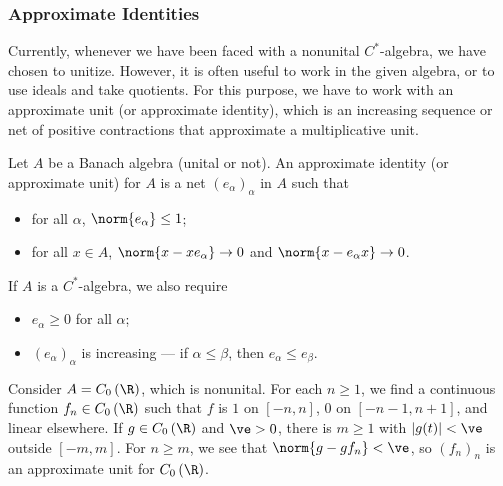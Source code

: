 \documentclass[10pt]{mypackage}
\begin{document}
\subsubsection{Approximate Identities}%
Currently, whenever we have been faced with a nonunital $C^{\ast}$-algebra, we have chosen to unitize. However, it is often useful to work in the given algebra, or to use ideals and take quotients. For this purpose, we have to work with an approximate unit (or approximate identity), which is an increasing sequence or net of positive contractions that approximate a multiplicative unit.
\begin{definition}
  Let $A$ be a Banach algebra (unital or not). An approximate identity (or approximate unit) for $A$ is a net $\left(e_{\alpha}\right)_{\alpha}$ in $A$ such that
  \begin{itemize}
    \item for all $\alpha$, $\norm{e_{\alpha}} \leq 1$;
    \item for all $x\in A$, $\norm{x - xe_{\alpha}}\rightarrow 0$ and $\norm{x - e_{\alpha}x}\rightarrow 0$.
  \end{itemize}
  If $A$ is a $C^{\ast}$-algebra, we also require
  \begin{itemize}
    \item $e_{\alpha}\geq 0$ for all $\alpha$;
    \item $\left(e_{\alpha}\right)_{\alpha}$ is increasing --- if $\alpha \leq \beta$, then $e_{\alpha}\leq e_{\beta}$.
  \end{itemize}
\end{definition}
\begin{example}
  Consider $A = C_0\left(\R\right)$, which is nonunital. For each $n\geq 1$, we find a continuous function $f_n\in C_0\left(\R\right)$ such that $f$ is $1$ on $\left[-n,n\right]$, $0$ on $\left[-n-1,n+1\right]$, and linear elsewhere. If $g\in C_0\left(\R\right)$ and $\ve > 0$, there is $m \geq 1$ with $\left\vert g(t) \right\vert < \ve$ outside $\left[-m,m\right]$. For $n\geq m$, we see that $\norm{g-gf_n} < \ve$, so $\left(f_n\right)_n$ is an approximate unit for $C_0\left(\R\right)$.
\end{example}
\end{document}
